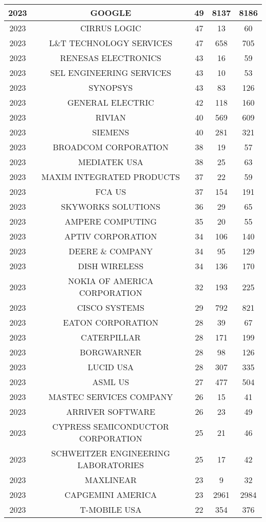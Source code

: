 \documentclass{article}%
\begin{document}
\begin{longtable}{c|c|c|c|c}
\hline%
2023&GOOGLE&49&8137&8186\\%
\hline%
2023&CIRRUS LOGIC&47&13&60\\%
\hline%
2023&L\&T TECHNOLOGY SERVICES&47&658&705\\%
\hline%
2023&RENESAS ELECTRONICS&43&16&59\\%
\hline%
2023&SEL ENGINEERING SERVICES&43&10&53\\%
\hline%
2023&SYNOPSYS&43&83&126\\%
\hline%
2023&GENERAL ELECTRIC&42&118&160\\%
\hline%
2023&RIVIAN&40&569&609\\%
\hline%
2023&SIEMENS&40&281&321\\%
\hline%
2023&BROADCOM CORPORATION&38&19&57\\%
\hline%
2023&MEDIATEK USA&38&25&63\\%
\hline%
2023&MAXIM INTEGRATED PRODUCTS&37&22&59\\%
\hline%
2023&FCA US&37&154&191\\%
\hline%
2023&SKYWORKS SOLUTIONS&36&29&65\\%
\hline%
2023&AMPERE COMPUTING&35&20&55\\%
\hline%
2023&APTIV CORPORATION&34&106&140\\%
\hline%
2023&DEERE \& COMPANY&34&95&129\\%
\hline%
2023&DISH WIRELESS&34&136&170\\%
\hline%
2023&NOKIA OF AMERICA CORPORATION&32&193&225\\%
\hline%
2023&CISCO SYSTEMS&29&792&821\\%
\hline%
2023&EATON CORPORATION&28&39&67\\%
\hline%
2023&CATERPILLAR&28&171&199\\%
\hline%
2023&BORGWARNER&28&98&126\\%
\hline%
2023&LUCID USA&28&307&335\\%
\hline%
2023&ASML US&27&477&504\\%
\hline%
2023&MASTEC SERVICES COMPANY&26&15&41\\%
\hline%
2023&ARRIVER SOFTWARE&26&23&49\\%
\hline%
2023&CYPRESS SEMICONDUCTOR CORPORATION&25&21&46\\%
\hline%
2023&SCHWEITZER ENGINEERING LABORATORIES&25&17&42\\%
\hline%
2023&MAXLINEAR&23&9&32\\%
\hline%
2023&CAPGEMINI AMERICA&23&2961&2984\\%
\hline%
2023&T{-}MOBILE USA&22&354&376\\%

\end{longtable}
\end{document}
